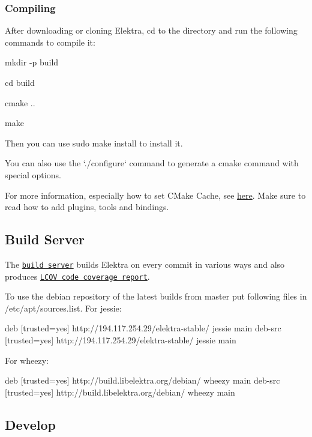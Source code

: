 \subsubsection*{Compiling}

After downloading or cloning Elektra, {\ttfamily cd} to the directory and run the following commands to compile it\+:


\begin{DoxyItemize}
\item {\ttfamily mkdir -\/p build}
\item {\ttfamily cd build}
\item {\ttfamily cmake ..}
\item {\ttfamily make}
\end{DoxyItemize}

Then you can use {\ttfamily sudo make install} to install it.

You can also use the `./configure` command to generate a {\ttfamily cmake} command with special options.

For more information, especially how to set C\+Make Cache, see \hyperlink{doc_COMPILE_md}{here}. Make sure to read how to add plugins, tools and bindings.

\subsection*{Build Server}

The \href{http://build.libelektra.org:8080/}{\tt build server} builds Elektra on every commit in various ways and also produces \href{http://doc.libelektra.org/coverage/latest}{\tt L\+C\+O\+V code coverage report}.

To use the debian repository of the latest builds from master put following files in /etc/apt/sources.list. For jessie\+: \begin{DoxyVerb}    deb     [trusted=yes] http://194.117.254.29/elektra-stable/ jessie main
    deb-src [trusted=yes] http://194.117.254.29/elektra-stable/ jessie main
\end{DoxyVerb}


For wheezy\+: \begin{DoxyVerb}     deb     [trusted=yes] http://build.libelektra.org/debian/ wheezy main
     deb-src [trusted=yes] http://build.libelektra.org/debian/ wheezy main
\end{DoxyVerb}


\subsection*{Develop}

